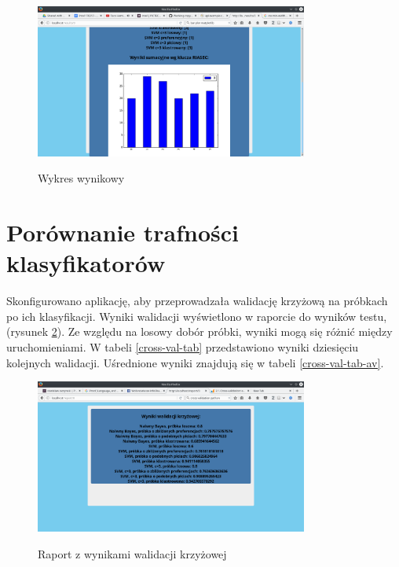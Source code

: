 \documentclass[12pt,a4paper,oneside]{report} %
\begin{document}
\begin{figure}
\centering
\includegraphics[width=0.8\textwidth]{10.png}
\label{outputs}
\caption{Wykres wynikowy}
\end{figure}

\section{Porównanie trafności klasyfikatorów}

Skonfigurowano aplikację, aby przeprowadzała walidację krzyżową na próbkach po ich klasyfikacji. Wyniki walidacji wyświetlono w raporcie do wyników testu, (rysunek \ref{cross-validation}). Ze względu na losowy dobór próbki, wyniki mogą się różnić między uruchomieniami. W tabeli \ref{cross-val-tab} przedstawiono wyniki dziesięciu kolejnych walidacji. Uśrednione wyniki znajdują się w tabeli \ref{cross-val-tab-av}.

\begin{figure}
\centering
\includegraphics[width=0.8\textwidth]{5.png}
\label{cross-validation}
\caption{Raport z wynikami walidacji krzyżowej}
\end{figure}
\end{document}
